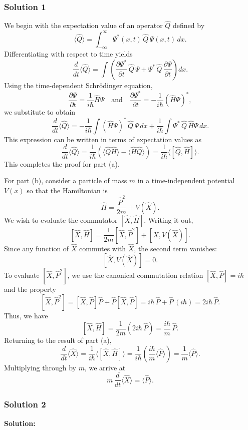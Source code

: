 \documentclass{article}
\begin{document}
\subsubsection{Solution 1}

We begin with the expectation value of an operator $\hat{Q}$ defined by
\[
\langle \hat{Q} \rangle = \int_{-\infty}^{\infty} \Psi^*(x,t)\,\hat{Q}\,\Psi(x,t)\,dx.
\]
Differentiating with respect to time yields
\[
\frac{d}{dt}\langle \hat{Q} \rangle = \int \left( \frac{\partial \Psi^*}{\partial t}\,\hat{Q}\,\Psi + \Psi^*\,\hat{Q}\,\frac{\partial \Psi}{\partial t} \right) dx.
\]
Using the time-dependent Schrödinger equation,
\[
\frac{\partial \Psi}{\partial t} = \frac{1}{i\hbar}\hat{H}\Psi \quad \text{and} \quad \frac{\partial \Psi^*}{\partial t} = -\frac{1}{i\hbar} (\hat{H}\Psi)^*,
\]
we substitute to obtain
\[
\frac{d}{dt}\langle \hat{Q} \rangle = -\frac{1}{i\hbar}\int (\hat{H}\Psi)^*\,\hat{Q}\,\Psi\,dx + \frac{1}{i\hbar}\int \Psi^*\,\hat{Q}\,\hat{H}\Psi\,dx.
\]
This expression can be written in terms of expectation values as
\[
\frac{d}{dt}\langle \hat{Q} \rangle = \frac{1}{i\hbar}\left(\langle \hat{Q}\hat{H} \rangle - \langle \hat{H}\hat{Q} \rangle\right) = \frac{1}{i\hbar}\langle [\hat{Q},\hat{H}] \rangle.
\]
This completes the proof for part (a).

For part (b), consider a particle of mass $m$ in a time-independent potential $V(x)$ so that the Hamiltonian is
\[
\hat{H} = \frac{\hat{P}^2}{2m} + V(\hat{X}).
\]
We wish to evaluate the commutator $[\hat{X},\hat{H}]$. Writing it out,
\[
[\hat{X},\hat{H}] = \frac{1}{2m}[\hat{X},\hat{P}^2] + [\hat{X},V(\hat{X})].
\]
Since any function of $\hat{X}$ commutes with $\hat{X}$, the second term vanishes:
\[
[\hat{X},V(\hat{X})] = 0.
\]
To evaluate $[\hat{X},\hat{P}^2]$, we use the canonical commutation relation $[\hat{X},\hat{P}] = i\hbar$ and the property
\[
[\hat{X},\hat{P}^2] = [\hat{X},\hat{P}]\hat{P} + \hat{P}[\hat{X},\hat{P}] = i\hbar\,\hat{P} + \hat{P}\,(i\hbar) = 2i\hbar\,\hat{P}.
\]
Thus, we have
\[
[\hat{X},\hat{H}] = \frac{1}{2m}(2i\hbar\,\hat{P}) = \frac{i\hbar}{m}\,\hat{P}.
\]
Returning to the result of part (a),
\[
\frac{d}{dt}\langle \hat{X} \rangle = \frac{1}{i\hbar}\langle [\hat{X},\hat{H}] \rangle = \frac{1}{i\hbar}\left(\frac{i\hbar}{m}\langle \hat{P} \rangle\right) = \frac{1}{m}\langle \hat{P} \rangle.
\]
Multiplying through by $m$, we arrive at
\[
m\,\frac{d}{dt}\langle \hat{X} \rangle = \langle \hat{P} \rangle.
\]

\subsubsection{Solution 2}
\textbf{Solution:}
\end{document}
